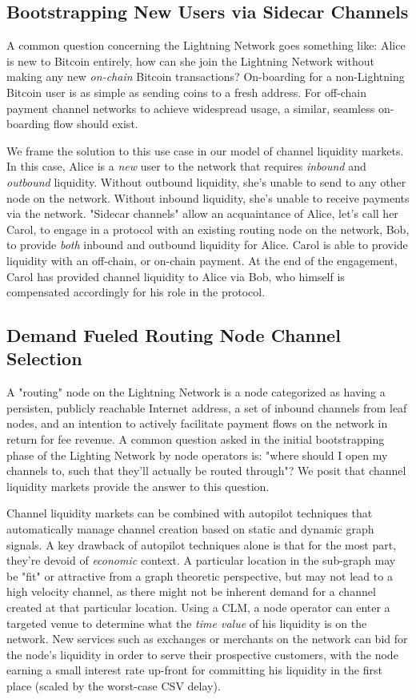 \documentclass[10pt,a4paper]{article}
\theoremstyle{definition}
\begin{document}
\subsection{Bootstrapping New Users via Sidecar Channels}

A common question concerning the Lightning Network goes something like: Alice
is new to Bitcoin entirely, how can she join the Lightning Network without
making any new \emph{on-chain} Bitcoin transactions? On-boarding for a
non-Lightning Bitcoin user is as simple as sending coins to a fresh address.
For off-chain payment channel networks to achieve widespread usage, a similar,
seamless on-boarding flow should exist.

We frame the solution to this use case in our model of channel liquidity
markets. In this case, Alice is a \emph{new} user to the network that requires
\emph{inbound} and \emph{outbound} liquidity. Without outbound liquidity, she's
unable to send to any other node on the network. Without inbound liquidity,
she's unable to receive payments via the network. "Sidecar channels" allow an
acquaintance of Alice, let's call her Carol, to engage in a protocol with an
existing routing node on the network, Bob, to provide \emph{both} inbound and
outbound liquidity for Alice. Carol is able to provide liquidity with an
off-chain, or on-chain payment. At the end of the engagement, Carol has
provided channel liquidity to Alice via Bob, who himself is compensated
accordingly for his role in the protocol.

\subsection{Demand Fueled Routing Node Channel Selection}

A "routing" node on the Lightning Network is a node categorized as having a
persisten, publicly reachable Internet address, a set of inbound channels from
leaf nodes, and an intention to actively facilitate payment flows on the
network in return for fee revenue. A common question asked in the initial
bootstrapping phase of the Lighting Network by node operators is: "where should
I open my channels to, such that they'll actually be routed through"? We posit
that channel liquidity markets provide the answer to this question.

Channel liquidity markets can be combined with autopilot \cite{autopilot}
techniques that automatically manage channel creation based on static and
dynamic graph signals. A key drawback of autopilot techniques alone is that for
the most part, they're devoid of \emph{economic} context. A particular location
in the sub-graph may be "fit" or attractive from a graph theoretic perspective,
but may not lead to a high velocity channel, as there might not be inherent
demand for a channel created at that particular location. Using a CLM, a node
operator can enter a targeted venue to determine what the \emph{time value} of
his liquidity is on the network. New services such as exchanges or merchants on
the network can bid for the node's liquidity in order to serve their
prospective customers, with the node earning a small interest rate up-front for
committing his liquidity in the first place (scaled by the worst-case CSV
delay).
\end{document}
